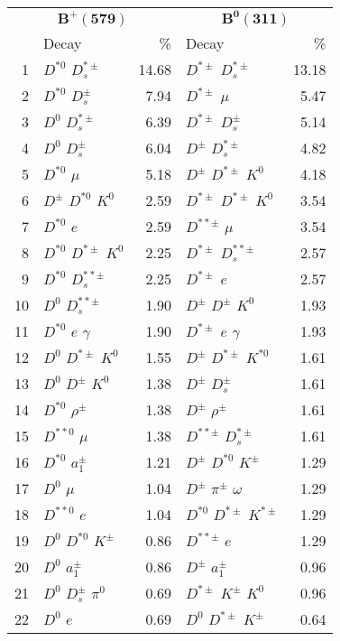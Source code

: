 \documentclass[6pt]{article}
\begin{document}
\begin{tabular}{rlr|lr}
\multicolumn{3}{c|}{$\boldsymbol{B^+(579)}$} & \multicolumn{2}{c}{$\boldsymbol{B^0(311)}$} \\
& Decay & \% & Decay & \% \\ \hline \hline
1 & $D^{*0}$ $D_s^{*\pm}$ & 14.68 & $D^{*\pm}$ $D_s^{*\pm}$ & 13.18 \\
2 & $D^{*0}$ $D_s^{\pm}$ & 7.94 & $D^{*\pm}$ $\mu$ & 5.47 \\
3 & $D^0$ $D_s^{*\pm}$ & 6.39 & $D^{*\pm}$ $D_s^{\pm}$ & 5.14 \\
4 & $D^0$ $D_s^{\pm}$ & 6.04 & $D^{\pm}$ $D_s^{*\pm}$ & 4.82 \\
5 & $D^{*0}$ $\mu$ & 5.18 & $D^{\pm}$ $D^{*\pm}$ $K^0$ & 4.18 \\
6 & $D^{\pm}$ $D^{*0}$ $K^0$ & 2.59 & $D^{*\pm}$ $D^{*\pm}$ $K^0$ & 3.54 \\
7 & $D^{*0}$ $e$ & 2.59 & $D^{**\pm}$ $\mu$ & 3.54 \\
8 & $D^{*0}$ $D^{*\pm}$ $K^0$ & 2.25 & $D^{*\pm}$ $D_s^{**\pm}$ & 2.57 \\
9 & $D^{*0}$ $D_s^{**\pm}$ & 2.25 & $D^{*\pm}$ $e$ & 2.57 \\
10 & $D^0$ $D_s^{**\pm}$ & 1.90 & $D^{\pm}$ $D^{\pm}$ $K^0$ & 1.93 \\
11 & $D^{*0}$ $e$ $\gamma$ & 1.90 & $D^{*\pm}$ $e$ $\gamma$ & 1.93 \\
12 & $D^0$ $D^{*\pm}$ $K^0$ & 1.55 & $D^{\pm}$ $D^{*\pm}$ $K^{*0}$ & 1.61 \\
13 & $D^0$ $D^{\pm}$ $K^0$ & 1.38 & $D^{\pm}$ $D_s^{\pm}$ & 1.61 \\
14 & $D^{*0}$ $\rho^{\pm}$ & 1.38 & $D^{\pm}$ $\rho^{\pm}$ & 1.61 \\
15 & $D^{**0}$ $\mu$ & 1.38 & $D^{**\pm}$ $D_s^{*\pm}$ & 1.61 \\
16 & $D^{*0}$ $a_1^{\pm}$ & 1.21 & $D^{\pm}$ $D^{*0}$ $K^{\pm}$ & 1.29 \\
17 & $D^0$ $\mu$ & 1.04 & $D^{\pm}$ $\pi^{\pm}$ $\omega$ & 1.29 \\
18 & $D^{**0}$ $e$ & 1.04 & $D^{*0}$ $D^{*\pm}$ $K^{*\pm}$ & 1.29 \\
19 & $D^0$ $D^{*0}$ $K^{\pm}$ & 0.86 & $D^{**\pm}$ $e$ & 1.29 \\
20 & $D^0$ $a_1^{\pm}$ & 0.86 & $D^{\pm}$ $a_1^{\pm}$ & 0.96 \\
21 & $D^0$ $D_s^{\pm}$ $\pi^0$ & 0.69 & $D^{*\pm}$ $K^{\pm}$ $K^0$ & 0.96 \\
22 & $D^0$ $e$ & 0.69 & $D^0$ $D^{*\pm}$ $K^{\pm}$ & 0.64 \\

\end{tabular}
\end{document}
